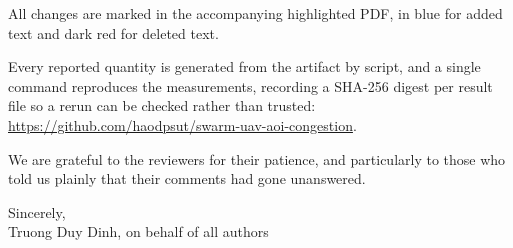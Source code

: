 \documentclass[11pt]{article}
\providecommand{\markupNote}{}   %
\begin{document}
All changes are marked in the accompanying highlighted PDF, in blue for added text and
dark red for deleted text. \markupNote

Every reported quantity is generated from the artifact by script, and a single command
reproduces the measurements, recording a SHA-256 digest per result file so a rerun can
be checked rather than trusted:
\url{https://github.com/haodpsut/swarm-uav-aoi-congestion}.

We are grateful to the reviewers for their patience, and particularly to those who
told us plainly that their comments had gone unanswered.

\vspace{0.4em}

\noindent
Sincerely,\\
Truong Duy Dinh, on behalf of all authors
\end{document}
